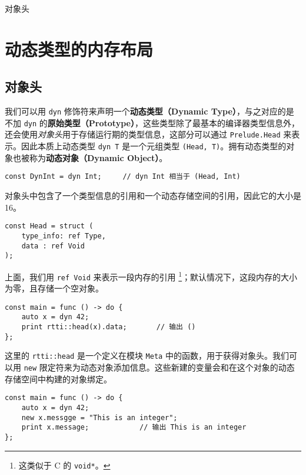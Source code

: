 \begin{introduction}
	\item 对象头
\end{introduction}

\section{动态类型的内存布局}

\subsection{对象头}

我们可以用 \lstinline!dyn! 修饰符来声明一个\textbf{动态类型（Dynamic Type）}，与之对应的是不加 \lstinline!dyn! 的\textbf{原始类型（Prototype）}，这些类型除了最基本的编译器类型信息外，还会使用\emph{对象头}用于存储运行期的类型信息，这部分可以通过 \lstinline!Prelude.Head! 来表示。因此本质上动态类型 \lstinline!dyn T! 是一个元组类型 \lstinline!(Head, T)!。拥有动态类型的对象也被称为\textbf{动态对象（Dynamic Object）}。

\begin{lstlisting}
const DynInt = dyn Int;		// dyn Int 相当于 (Head, Int)
\end{lstlisting}

对象头中包含了一个类型信息的引用和一个动态存储空间的引用，因此它的大小是 16。

\begin{lstlisting}
const Head = struct (
	type_info: ref Type,
	data : ref Void
);
\end{lstlisting}

上面，我们用 \lstinline!ref Void! 来表示一段内存的引用 \footnote{这类似于 C 的 \lstinline!void*!。}；默认情况下，这段内存的大小为零，且存储一个空对象。

\begin{lstlisting}
const main = func () -> do {
	auto x = dyn 42;
	print rtti::head(x).data;		// 输出 ()
};
\end{lstlisting}

这里的 \lstinline!rtti::head! 是一个定义在模块 \lstinline!Meta! 中的函数，用于获得对象头。我们可以用 \lstinline!new! 限定符来为动态对象添加信息。这些新建的变量会和在这个对象的动态存储空间中构建的对象绑定。

\begin{lstlisting}
const main = func () -> do {
	auto x = dyn 42;
	new x.messgge = "This is an integer";
	print x.message;			// 输出 This is an integer
};
\end{lstlisting}

